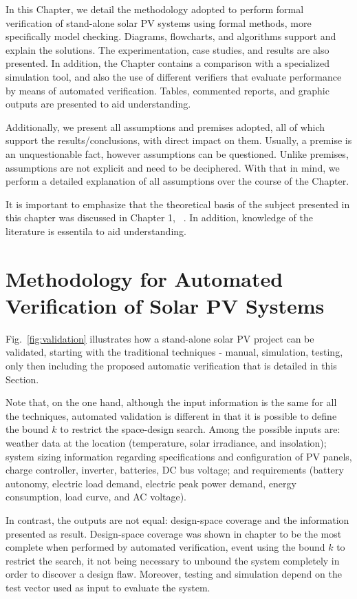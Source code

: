 In this Chapter, we detail the methodology adopted to perform formal verification of stand-alone solar PV systems using formal methods, more specifically model checking. Diagrams, flowcharts, and algorithms support and explain the solutions. The experimentation, case studies, and results are also presented. In addition, the Chapter contains a comparison with a specialized simulation tool, and also the use of different verifiers that evaluate performance by means of automated verification. Tables, commented reports, and graphic outputs are presented to aid  understanding.

Additionally, we present all assumptions and premises adopted, all of which support the results/conclusions, with direct impact on them. Usually, a premise is an unquestionable fact, however assumptions can be questioned. Unlike premises, assumptions are not explicit and need to be deciphered. With that in mind, we perform a detailed explanation of all assumptions over the course of the Chapter.

It is important to emphasize that the theoretical basis of the subject presented in this chapter was discussed in Chapter 1, ~. In addition, knowledge of the literature is essentila to aid understanding.


\section{Methodology for Automated Verification of Solar PV Systems}

Fig.~\ref{fig:validation} illustrates how a stand-alone solar PV project can be validated, starting with the traditional techniques - manual, simulation, testing, only then including the proposed automatic verification that is detailed in this Section. 

Note that, on the one hand, although the input information is the same for all the techniques, automated validation is different in that it is possible to define the bound $k$ to restrict the space-design search. Among the possible inputs are: weather data at the location (temperature, solar irradiance, and insolation); system sizing information regarding specifications and configuration of PV panels, charge controller, inverter, batteries, DC bus  voltage; and requirements (battery autonomy, electric load demand, electric peak power demand, energy consumption, load curve, and AC voltage).

In contrast, the outputs are not equal: design-space coverage and the information presented as result. Design-space coverage was shown in chapter  to be the most complete when performed by automated verification, event using the bound $k$ to restrict the search, it not being necessary to unbound the system completely in order to discover a design flaw. Moreover, testing and simulation depend on the test vector used as input to evaluate the system.

